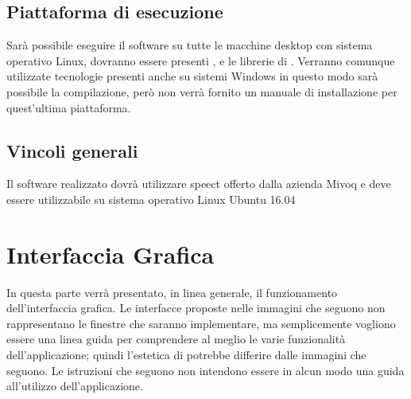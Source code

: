 \documentclass[../AnalisideiRequisiti.tex]{subfiles}
\begin{document}
\section{Piattaforma di esecuzione}
Sarà possibile eseguire il software su tutte le macchine desktop con sistema operativo Linux, dovranno essere presenti ,  e le librerie di . Verranno comunque utilizzate tecnologie presenti anche su sistemi Windows in questo modo sarà possibile la compilazione, però non verrà fornito un manuale di installazione per quest’ultima piattaforma.

\section{Vincoli generali}
Il software realizzato dovrà utilizzare speect offerto dalla azienda Mivoq e deve essere utilizzabile su sistema operativo Linux Ubuntu 16.04 
	

\chapter{Interfaccia Grafica}
In questa parte verrà presentato, in linea generale, il funzionamento dell'interfaccia grafica. Le interfacce proposte nelle immagini che seguono non rappresentano le finestre che saranno implementare, ma semplicemente vogliono essere una linea guida per comprendere al meglio le varie funzionalità dell'applicazione; quindi l'estetica di \textit{} potrebbe differire dalle immagini che seguono. Le istruzioni che seguono non intendono essere in alcun modo una guida all'utilizzo dell'applicazione.
\end{document}

